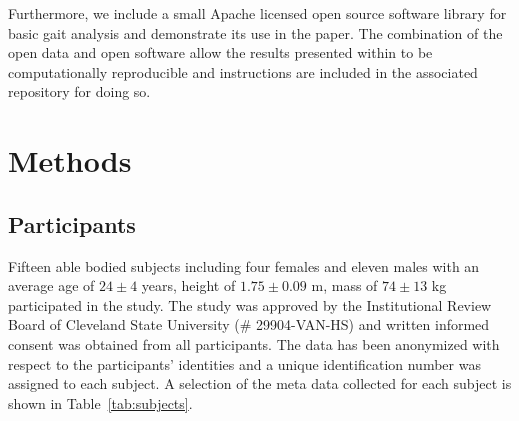 \documentclass[fleqn,12pt]{wlpeerj}
\begin{document}
Furthermore, we include a small Apache licensed open source software library
for basic gait analysis and demonstrate its use in the paper. The combination
of the open data and open software allow the results presented within to be
computationally reproducible and instructions are included in the associated
repository for doing so.

\section*{Methods}
\subsection*{Participants}
%
Fifteen able bodied subjects including four females and eleven males with an
average age of $24\pm4$ years, height of $1.75\pm0.09$ m, mass of $74\pm13$ kg
participated in the study. The study was approved by the Institutional Review
Board of Cleveland State University (\# 29904-VAN-HS) and written informed
consent was obtained from all participants. The data has been anonymized with
respect to the participants' identities and a unique identification number was
assigned to each subject. A selection of the meta data collected for each
subject is shown in Table~\ref{tab:subjects}.
%
\begin{table}
  \cprotect\caption{Information about the 15 participants. The final three
    columns give the trial numbers associated with each nominal treadmill
    speed. The measured mass is computed from the mean total vertical ground
    reaction force just after the calibration pose event, if possible.
    Additional trials found in the data set with a subject identification
    number 0 are trials with no subject, i.e.  unloaded trials that can be used
    for inertial compensation purposes, and are not shown in the table. Generated
    by \verb|src/subject_table.py|.}
  \centering
  \small
  
  \label{tab:subjects}
\end{table}
\end{document}
